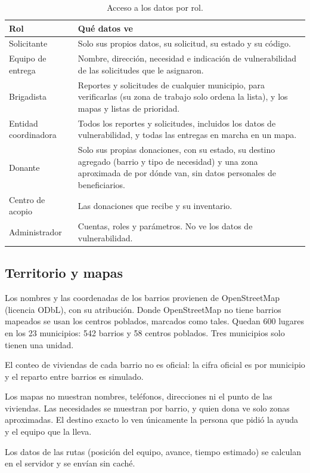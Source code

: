\begin{table}[H]
\centering
\caption{Acceso a los datos por rol.}\label{tab:acceso}
\begin{tabularx}{\textwidth}{@{}p{3.1cm}X@{}}
\toprule
\textbf{Rol} & \textbf{Qué datos ve} \\
\midrule
Solicitante & Solo sus propios datos, su solicitud, su estado y su código. \\
Equipo de entrega & Nombre, dirección, necesidad e indicación de vulnerabilidad de las solicitudes que le asignaron. \\
Brigadista & Reportes y solicitudes de cualquier municipio, para verificarlas (su zona de trabajo solo ordena la lista), y los mapas y listas de prioridad. \\
Entidad coordinadora & Todos los reportes y solicitudes, incluidos los datos de vulnerabilidad, y todas las entregas en marcha en un mapa. \\
Donante & Solo sus propias donaciones, con su estado, su destino agregado (barrio y tipo de necesidad) y una zona aproximada de por dónde van, sin datos personales de beneficiarios. \\
Centro de acopio & Las donaciones que recibe y su inventario. \\
Administrador & Cuentas, roles y parámetros. No ve los datos de vulnerabilidad. \\
\bottomrule
\end{tabularx}
\end{table}

\subsection{Territorio y mapas}
\begin{description}[leftmargin=0pt]
  \item[RD-24 (\Must).] Los nombres y las coordenadas de los barrios provienen de OpenStreetMap (licencia ODbL), con su atribución. Donde OpenStreetMap no tiene barrios mapeados se usan los centros poblados, marcados como tales. Quedan 600 lugares en los 23 municipios: 542 barrios y 58 centros poblados. Tres municipios solo tienen una unidad.
  \item[RD-25 (\Must).] El conteo de viviendas de cada barrio no es oficial: la cifra oficial es por municipio y el reparto entre barrios es simulado.
  \item[RD-26 (\Must).] Los mapas no muestran nombres, teléfonos, direcciones ni el punto de las viviendas. Las necesidades se muestran por barrio, y quien dona ve solo zonas aproximadas. El destino exacto lo ven únicamente la persona que pidió la ayuda y el equipo que la lleva.
  \item[RD-27 (\Should).] Los datos de las rutas (posición del equipo, avance, tiempo estimado) se calculan en el servidor y se envían sin caché.
\end{description}

